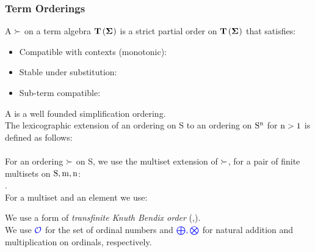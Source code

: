 \subsubsection*{Term Orderings}
A  $\mathrm{\succ}$ on a term algebra $\Ts{\sig}$ is a strict partial order on $\Ts{\sig}$ that satisfies:
\begin{itemize}
	\item Compatible with contexts (monotonic):\\
	\item Stable under substitution: \\
	\item Sub-term compatible: \\
		\m{\rhd \subseteq \succ}
\end{itemize}
A  is a well founded simplification ordering.\\
The lexicographic extension of an ordering on S to an ordering on $\mathrm{S^n}$ for $\mathrm{n>1}$ is defined as follows:\\
\\
For an ordering $\mathrm{\succ}$ on S, we use the multiset extension of $\mathrm{\succ}$, for a pair of finite multisets on $\mathrm{S}, \mathrm{m,n}$:\\
.\\
For a multiset  and an element  we use:\\

\noindent
We use a form of \emph{transfinite Knuth Bendix order} (\cite{WinklerZanklMiddeldorp12},\cite{KovacsMoserVoronkov11}).\\
We use $\textcolor{blue}{\mathcal{O}}$ for the set of ordinal numbers and $\textcolor{blue}{\bigoplus,\bigotimes}$ for natural addition and multiplication on ordinals, respectively.

